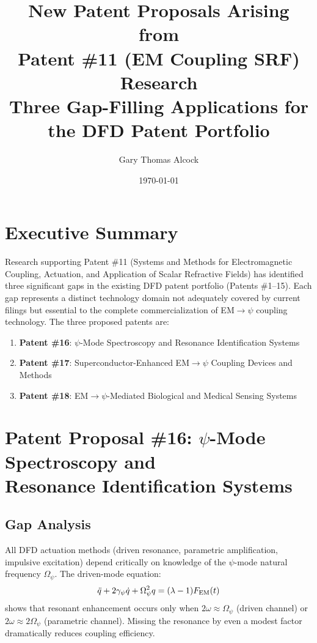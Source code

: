 \documentclass[12pt,letterpaper]{article}
\title{New Patent Proposals Arising from\\
Patent \#11 (EM Coupling SRF) Research\\[6pt]
\large Three Gap-Filling Applications for the DFD Patent Portfolio}
\author{Gary Thomas Alcock}
\date{\today}
\begin{document}
\maketitle

\section*{Executive Summary}

Research supporting Patent \#11 (Systems and Methods for Electromagnetic
Coupling, Actuation, and Application of Scalar Refractive Fields) has
identified three significant gaps in the existing DFD patent portfolio
(Patents \#1--15). Each gap represents a distinct technology domain not
adequately covered by current filings but essential to the complete
commercialization of EM$\to\psi$ coupling technology. The three proposed
patents are:

\begin{enumerate}
\item \textbf{Patent \#16}: $\psi$-Mode Spectroscopy and Resonance
Identification Systems
\item \textbf{Patent \#17}: Superconductor-Enhanced EM$\to\psi$ Coupling
Devices and Methods
\item \textbf{Patent \#18}: EM$\to\psi$-Mediated Biological and Medical
Sensing Systems
\end{enumerate}

\section{Patent Proposal \#16: $\psi$-Mode Spectroscopy and\\
Resonance Identification Systems}

\subsection{Gap Analysis}

All DFD actuation methods (driven resonance, parametric amplification,
impulsive excitation) depend critically on knowledge of the $\psi$-mode
natural frequency $\Omega_\psi$. The driven-mode equation:
\[
\ddot{q} + 2\gamma_\psi\dot{q} + \Omega_\psi^2 q
= (\lambda-1)F_{\rm EM}(t)
\]
shows that resonant enhancement occurs only when $2\omega \approx \Omega_\psi$
(driven channel) or $2\omega \approx 2\Omega_\psi$ (parametric channel).
Missing the resonance by even a modest factor dramatically reduces
coupling efficiency.
\end{document}
